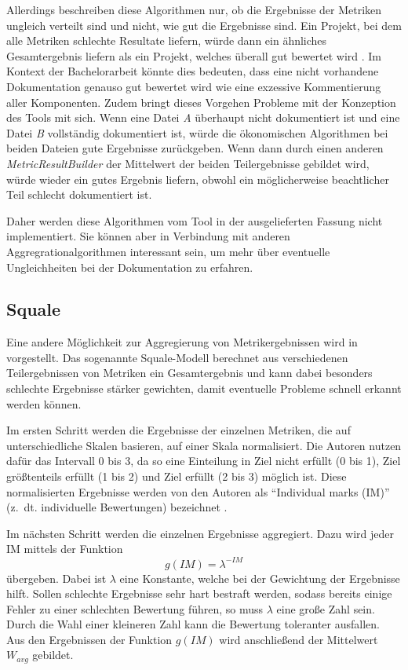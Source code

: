  Allerdings beschreiben diese Algorithmen nur, ob die Ergebnisse der Metriken ungleich verteilt sind und nicht, wie gut die Ergebnisse sind. Ein Projekt, bei dem alle Metriken schlechte Resultate liefern, würde dann ein ähnliches Gesamtergebnis liefern als ein Projekt, welches überall gut bewertet wird \cite[S. 1121]{Softwarequalitymetricsaggregationinindustry}.  Im Kontext der Bachelorarbeit könnte dies bedeuten, dass eine nicht vorhandene Dokumentation genauso gut bewertet wird wie eine exzessive Kommentierung aller Komponenten. Zudem bringt dieses Vorgehen Probleme mit der Konzeption des Tools mit sich. Wenn eine Datei \textit{A} überhaupt nicht dokumentiert ist und eine Datei \textit{B} vollständig dokumentiert ist, würde die ökonomischen Algorithmen bei beiden Dateien gute Ergebnisse zurückgeben. Wenn dann durch einen anderen \textit{MetricResultBuilder} der Mittelwert der beiden Teilergebnisse gebildet wird, würde wieder ein gutes Ergebnis liefern, obwohl ein möglicherweise beachtlicher Teil schlecht dokumentiert ist.
 
 Daher werden diese Algorithmen vom Tool in der ausgelieferten Fassung nicht implementiert. Sie können aber in Verbindung mit anderen Aggregrationalgorithmen interessant sein, um mehr über eventuelle Ungleichheiten bei der Dokumentation zu erfahren.
 
 \subsection{Squale}
 Eine andere Möglichkeit zur Aggregierung von Metrikergebnissen wird in \cite[S. 1124]{Softwarequalitymetricsaggregationinindustry} vorgestellt. Das sogenannte Squale-Modell berechnet aus verschiedenen Teilergebnissen von Metriken ein Gesamtergebnis und kann dabei besonders schlechte Ergebnisse stärker gewichten, damit eventuelle Probleme schnell erkannt werden können. 
 
 Im ersten Schritt werden die Ergebnisse der einzelnen Metriken, die auf unterschiedliche Skalen basieren, auf einer Skala normalisiert. Die Autoren nutzen dafür das Intervall 0 bis 3, da so eine Einteilung in Ziel nicht erfüllt (0 bis 1), Ziel größtenteils erfüllt (1 bis 2) und Ziel erfüllt (2 bis 3) möglich ist. Diese normalisierten Ergebnisse werden von den Autoren als \enquote{Individual marks (IM)} (z.~dt. individuelle Bewertungen) bezeichnet \cite[S. 142]{AnEmpiricalModelforContinuousandWeightedMetricAggregation}. 
 
 Im nächsten Schritt werden die einzelnen Ergebnisse aggregiert. Dazu wird jeder IM mittels der Funktion
 \begin{equation}
     g(IM)=\lambda^{-IM}
 \end{equation} übergeben. Dabei ist $\lambda$ eine Konstante, welche bei der Gewichtung der Ergebnisse hilft. Sollen schlechte Ergebnisse sehr hart bestraft werden, sodass bereits einige Fehler zu einer schlechten Bewertung führen, so muss $\lambda$ eine große Zahl sein. Durch die Wahl einer kleineren Zahl kann die Bewertung toleranter ausfallen. Aus den Ergebnissen der Funktion $g(IM)$ wird anschließend der Mittelwert $W_{avg}$ gebildet.
 
